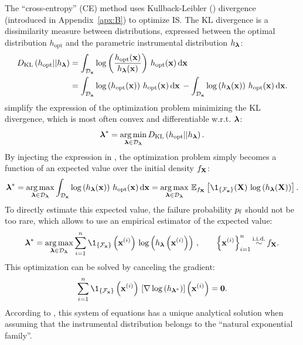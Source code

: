 The ``cross-entropy'' (CE) method \citep{rubinstein_2004_CE} uses Kullback-Leibler () divergence (introduced in Appendix~\ref{apx:B}) to optimize IS. 
The KL divergence is a dissimilarity measure between distributions, expressed between the optimal distribution $h_{\mathrm{opt}}$ and the parametric instrumental distribution $h_{\boldsymbol{\lambda}}$: 
\begin{subequations}
    \begin{align}
        D_{\mathrm{KL}}\left(h_{\mathrm{opt}} || h_{\boldsymbol{\lambda}}\right) &= \int_{\mathcal{D}_{\bf x}} \log \left(\frac{h_{\mathrm{opt}}({\bf x})}{h_{\boldsymbol{\lambda}}({\bf x})}\right) \, h_{\mathrm{opt}}({\bf x}) \, \mathrm{d} {\bf x}\\
            &= \int_{\mathcal{D}_{\bf x}} \log\left(h_{\mathrm{opt}}({\bf x})\right) \, h_{\mathrm{opt}}({\bf x}) \, \mathrm{d} {\bf x} \, - \int_{\mathcal{D}_{\bf x}} \log\left(h_{\boldsymbol{\lambda}}({\bf x})\right) \, h_{\mathrm{opt}}({\bf x}) \, \mathrm{d} {\bf x}.
    \label{eq:KL}
    \end{align}
\end{subequations}
\citet{rubinstein_2004_CE} simplify the expression of the optimization problem minimizing the KL divergence, which is most often convex and differentiable w.r.t. ${\boldsymbol{\lambda}}$:  
\begin{equation}
    {\boldsymbol{\lambda}}^* = \operatorname*{arg\,min}_{{\boldsymbol{\lambda}} \in \mathcal{D}_{\boldsymbol{\lambda}}} D_{\mathrm{KL}}\left(h_{\mathrm{opt}} || h_{\boldsymbol{\lambda}}\right). 
\end{equation}
By injecting the expression in , the optimization problem simply becomes a function of an expected value over the initial density $f_{\bf X}$:
\begin{equation}
    \blambda^* = \argmax_{\blambda \in \iD_\blambda} \int_{\iD_\bx} \log\left(h_\blambda(\bx)\right) \, h_{\mathrm{opt}}(\bx) \, \dd \bx
                = \argmax_{\blambda \in \iD_\blambda} \, \E_{f_\bX}\left[\1_{\{\iF_\bx\}}(\bX) \, \log\left(h_\blambda(\bX)\right) \right].
    \label{eq:empirical_KL}
\end{equation}
To directly estimate this expected value, the failure probability $p_\mathrm{f}$ should not be too rare, which allows to use an empirical estimator of the expected value:
\begin{equation}
        \blambda^* = \argmax_{\blambda \in \iD_\blambda} \sum_{i=1}^{n} \1_{\{\iF_\bx\}}\left(\bx^{(i)}\right) \, \log\left(h_\blambda\left(\bx^{(i)}\right)\right) \, , \qquad
        \left\{ \bx^{(i)} \right\}_{i=1}^n \simiid f_\bX.
\end{equation}
This optimization can be solved by canceling the gradient: 
\begin{equation}
    \sum_{i=1}^{n} \1_{\{\iF_\bx\}}\left(\bx^{(i)}\right) \, \left[\nabla \log\left(h_{\blambda^*}\right)\right]\left(\bx^{(i)}\right) = \mathbf{0}.
\end{equation}
According to \citet{rubinstein_2004_CE}, this system of equations has a unique analytical solution when assuming that the instrumental distribution belongs to the ``natural exponential family''. 

